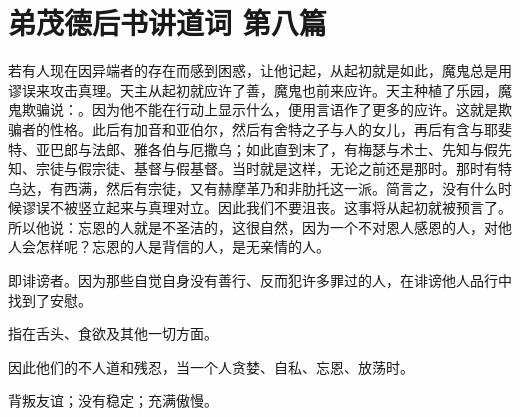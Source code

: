 

\section{弟茂德后书讲道词 第八篇}

\par

 \par

若有人现在因异端者的存在而感到困惑，让他记起，从起初就是如此，魔鬼总是用谬误来攻击真理。天主从起初就应许了善，魔鬼也前来应许。天主种植了乐园，魔鬼欺骗说：。因为他不能在行动上显示什么，便用言语作了更多的应许。这就是欺骗者的性格。此后有加音和亚伯尔，然后有舍特之子与人的女儿，再后有含与耶斐特、亚巴郎与法郎、雅各伯与厄撒乌；如此直到末了，有梅瑟与术士、先知与假先知、宗徒与假宗徒、基督与假基督。当时就是这样，无论之前还是那时。那时有特乌达，有西满，然后有宗徒，又有赫摩革乃和非肋托这一派。简言之，没有什么时候谬误不被竖立起来与真理对立。因此我们不要沮丧。这事将从起初就被预言了。所以他说：忘恩的人就是不圣洁的，这很自然，因为一个不对恩人感恩的人，对他人会怎样呢？忘恩的人是背信的人，是无亲情的人。\par

即诽谤者。因为那些自觉自身没有善行、反而犯许多罪过的人，在诽谤他人品行中找到了安慰。\par

指在舌头、食欲及其他一切方面。\par

因此他们的不人道和残忍，当一个人贪婪、自私、忘恩、放荡时。\par

 背叛友谊；没有稳定；充满傲慢。\par

